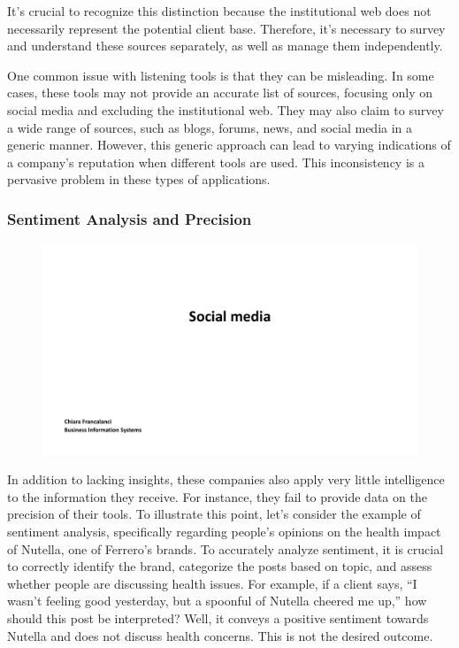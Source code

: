 It's crucial to recognize this distinction because the institutional web
does not necessarily represent the potential client base. Therefore,
it's necessary to survey and understand these sources separately, as
well as manage them independently.

One common issue with listening tools is that they can be misleading. In
some cases, these tools may not provide an accurate list of sources,
focusing only on social media and excluding the institutional web. They
may also claim to survey a wide range of sources, such as blogs, forums,
news, and social media in a generic manner. However, this generic
approach can lead to varying indications of a company's reputation when
different tools are used. This inconsistency is a pervasive problem in
these types of applications.

\subsubsection{Sentiment Analysis and
  Precision}\label{sentiment-analysis-and-precision}

\begin{figure}[!h]
  \centering
  \includegraphics[page=31, trim = 1.5cm 1.8cm 2.5cm 0.5cm, clip, width=\imagewidth]{images/04 - Social_Media.pdf}
\end{figure}

In addition to lacking insights, these companies also apply very little
intelligence to the information they receive. For instance, they fail to
provide data on the precision of their tools. To illustrate this point,
let's consider the example of sentiment analysis, specifically regarding
people's opinions on the health impact of Nutella, one of Ferrero's brands.
To accurately analyze sentiment, it is crucial to correctly identify the
brand, categorize the posts based on topic, and assess whether people
are discussing health issues. For example, if a client says, ``I wasn't
feeling good yesterday, but a spoonful of Nutella cheered me up,'' how
should this post be interpreted? Well, it conveys a positive sentiment
towards Nutella and does not discuss health concerns. This is not the
desired outcome.

